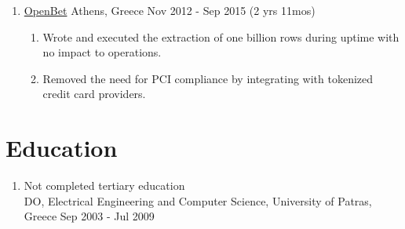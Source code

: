 \documentclass{CVSoftwareEngineer}
\begin{document}
\begin{enumerate}[labelwidth=!, labelindent=0pt, leftmargin=*, rightmargin=15pt]
		\item[]  
			{\href{https://www.openbet.com/}{OpenBet}}
			{Athens, Greece}
			{Nov 2012 - Sep 2015 (2 yrs 11mos)}
			{
				\begin{enumerate}[labelwidth=!, labelindent=0pt, nosep, leftmargin=*]
					\item[\textasteriskcentered] Wrote and executed the extraction of
						one billion rows during uptime with no impact to operations.
					\item[\textasteriskcentered] Removed the need for PCI compliance by
						integrating with tokenized credit card providers.
				\end{enumerate}
			}
	\end{enumerate}

	\section{Education}
	\begin{enumerate}[labelwidth=!, labelindent=0pt, leftmargin=*, rightmargin=15pt]
		\item[] Not completed tertiary education \\
			DO, Electrical Engineering and Computer Science, University of Patras, Greece \hfill {\scriptsize Sep 2003 - Jul 2009}
	\end{enumerate}
\end{document}
